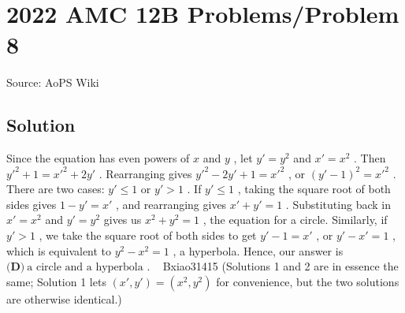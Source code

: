 \documentclass[12pt]{article}
\begin{document}
\section*{{2022 AMC 12B Problems/Problem 8}}
Source: AoPS Wiki

\subsection*{Solution}
Since the equation has even powers of $x$ and $y$ , let $y'=y^2$ and $x' = x^2$ . Then $y'^2 + 1 = x'^2 + 2y'$ . Rearranging gives $y'^2 - 2y' + 1 = x'^2$ , or $(y'-1)^2=x'^2$ . There are two cases: $y' \leq 1$ or $y' > 1$ . If $y' \leq 1$ , taking the square root of both sides gives $1 - y' = x'$ , and rearranging gives $x' + y' = 1$ . Substituting back in $x'=x^2$ and $y'=y^2$ gives us $x^2+y^2=1$ , the equation for a circle. Similarly, if $y' > 1$ , we take the square root of both sides to get $y' - 1 = x'$ , or $y' - x' = 1$ , which is equivalent to $y^2 - x^2 = 1$ , a hyperbola. Hence, our answer is $\boxed{\textbf{(D)}\ \text{a circle and a hyperbola}}$ . ~ Bxiao31415 (Solutions 1 and 2 are in essence the same; Solution 1 lets $(x',y')=\left(x^2,y^2\right)$ for convenience, but the two solutions are otherwise identical.)
\end{document}
